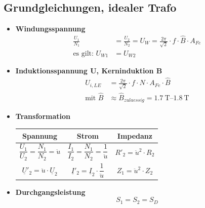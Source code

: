 \subsection{Grundgleichungen, idealer Trafo}
    \begin{itemize}

        \item[]{\textbf{Windungsspannung}}
            \begin{align*}
                \frac{U_{1}}{N_{1}} &= \frac{U_{2}}{N_{2}} = U_W = \frac{2 \pi}{\sqrt{2}} \cdot f \cdot \hat{B} \cdot A_{Fe} \\
                \text{es gilt: } U_{W1} &= U_{W2}
            \end{align*}

        \item[]{\textbf{Induktionsspannung U, Kerninduktion B}}
            \begin{align*}
                U_{i,LE} &= \frac{2 \pi}{\sqrt{2}} \cdot f \cdot N \cdot A_{Fe} \cdot \hat{B} \\
                \text{mit } \hat{B} &\approx \hat{B}_{zulaessig} = \SIrange{1.7}{1.8}{\tesla} 
            \end{align*}

        \item[] \textbf{Transformation}
            \vspace{-6pt}
            \begin{table}[H]
                \centering
                \begin{tabular}{c c c}
                    \toprule
                    \textbf{Spannung} & \textbf{Strom} & \textbf{Impedanz} \\
                    \midrule
                    \(\dfrac{U_{1}}{U_{2}} = \dfrac{N_{1}}{N_{2}} = \ddot{u}\) & \(\dfrac{I_{1}}{I_{2}} = \dfrac{N_{1}}{N_{2}} = \dfrac{1}{\ddot{u}}\) & \(R'_{2} = \ddot{u}^2 \cdot R_{2}\)\\
                    \(\underline{U}'_{2}  = \ddot{u} \cdot \underline{U}_{2}\) & \(\underline{I}'_{2} = \underline{I}_{2} \cdot \dfrac{1}{\ddot{u}}\) & \(Z_1 = \ddot{u}^2 \cdot Z_2\)\\
                    \bottomrule
                \end{tabular}
            \end{table}

        \item[]{\textbf{Durchgangsleistung}}
            \begin{equation*}
                S_{1} = S_{2} = S_{D}
            \end{equation*}


\end{itemize}
